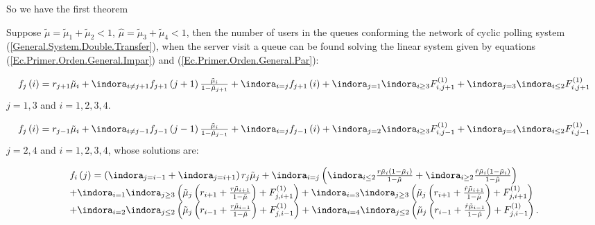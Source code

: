 So we have the first theorem

\begin{Teo}
Suppose  $\tilde{\mu}=\tilde{\mu}_{1}+\tilde{\mu}_{2}<1$, $\hat{\mu}=\tilde{\mu}_{3}+\tilde{\mu}_{4}<1$, then the number of users in the queues conforming the network of cyclic polling system (\ref{General.System.Double.Transfer}), when the server visit a queue can be found solving the linear system given by equations (\ref{Ec.Primer.Orden.General.Impar}) and (\ref{Ec.Primer.Orden.General.Par}):

\begin{eqnarray}\label{Ec.Primer.Orden.General.Impar}
\begin{array}{l}
f_{j}\left(i\right)=r_{j+1}\tilde{\mu}_{i}
+\indora_{i\neq j+1}f_{j+1}\left(j+1\right)\frac{\tilde{\mu}_{i}}{1-\tilde{\mu}_{j+1}}
+\indora_{i=j}f_{j+1}\left(i\right)
+\indora_{j=1}\indora_{i\geq3}F_{i,j+1}^{(1)}
+\indora_{j=3}\indora_{i\leq2}F_{i,j+1}^{(1)}
\end{array}
\end{eqnarray}
$j=1,3$ and $i=1,2,3,4$.

\begin{eqnarray}\label{Ec.Primer.Orden.General.Par}
\begin{array}{l}
f_{j}\left(i\right)=r_{j-1}\tilde{\mu}_{i}
+\indora_{i\neq j-1}f_{j-1}\left(j-1\right)\frac{\tilde{\mu}_{i}}{1-\tilde{\mu}_{j-1}}
+\indora_{i=j}f_{j-1}\left(i\right)
+\indora_{j=2}\indora_{i\geq3}F_{i,j-1}^{(1)}
+\indora_{j=4}\indora_{i\leq2}F_{i,j-1}^{(1)}
\end{array}
\end{eqnarray}
$j=2,4$ and $i=1,2,3,4$, whose solutions are:


\begin{eqnarray}
\begin{array}{l}
f_{i}\left(j\right)=\left(\indora_{j=i-1}+\indora_{j=i+1}\right)r_{j}\tilde{\mu}_{j}+\indora_{i=j}\left(\indora_{i\leq2}\frac{r\tilde{\mu}_{i}\left(1-\tilde{\mu}_{i}\right)}{1-\tilde{\mu}}+\indora_{i\geq2}\frac{\hat{r}\tilde{\mu}_{i}\left(1-\tilde{\mu}_{i}\right)}{1-\hat{\mu}}\right)\\
+\indora_{i=1}\indora_{j\geq3}\left(\tilde{\mu}_{j}\left(r_{i+1}+\frac{r\tilde{\mu}_{i+1}}{1-\tilde{\mu}}\right)+F_{j,i+1}^{(1)}\right)
+\indora_{i=3}\indora_{j\geq3}\left(\tilde{\mu}_{j}\left(r_{i+1}+\frac{\hat{r}\tilde{\mu}_{i+1}}{1-\hat{\mu}}\right)+F_{j,i+1}^{(1)}\right)\\
+\indora_{i=2}\indora_{j\leq2}\left(\tilde{\mu}_{j}\left(r_{i-1}+\frac{r\tilde{\mu}_{i-1}}{1-\tilde{\mu}}\right)+F_{j,i-1}^{(1)}\right)
+\indora_{i=4}\indora_{j\leq2}\left(\tilde{\mu}_{j}\left(r_{i-1}+\frac{\hat{r}\tilde{\mu}_{i-1}}{1-\hat{\mu}}\right)+F_{j,i-1}^{(1)}\right).
\end{array}
\end{eqnarray}
\end{Teo}

